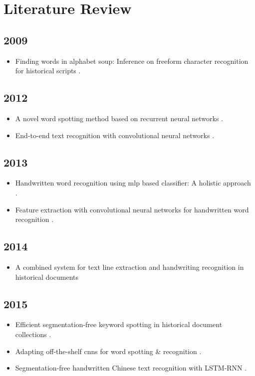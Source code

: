 \documentclass[final]{ukthesis}
\begin{document}
\section{Literature Review}
\subsection{2009}
\begin{itemize}
\item Finding words in alphabet soup: Inference on freeform character recognition for historical scripts \cite{howe2009finding}.
\end{itemize}

\subsection{2012}
\begin{itemize}
\item A novel word spotting method based on recurrent neural networks \cite{frinken2012novel}.
\item End-to-end text recognition with convolutional neural networks \cite{wang2012end}.
\end{itemize}

\subsection{2013}
\begin{itemize}
\item Handwritten word recognition using mlp based classifier: A holistic approach \cite{acharyya2013handwritten}.
\item Feature extraction with convolutional neural networks for handwritten word recognition \cite{bluche2013feature}.
\end{itemize}

\subsection{2014}
\begin{itemize}
\item A combined system for text line extraction and handwriting recognition in historical documents \cite{fischer2014combined}
\end{itemize}

\subsection{2015}
\begin{itemize}
\item Efficient segmentation-free keyword spotting in historical document collections \cite{rusinol2015efficient}.
\item Adapting off-the-shelf cnns for word spotting \& recognition \cite{sharma2015adapting}.
\item Segmentation-free handwritten Chinese text recognition with LSTM-RNN \cite{messina2015segmentation}.
\end{itemize}
\end{document}
